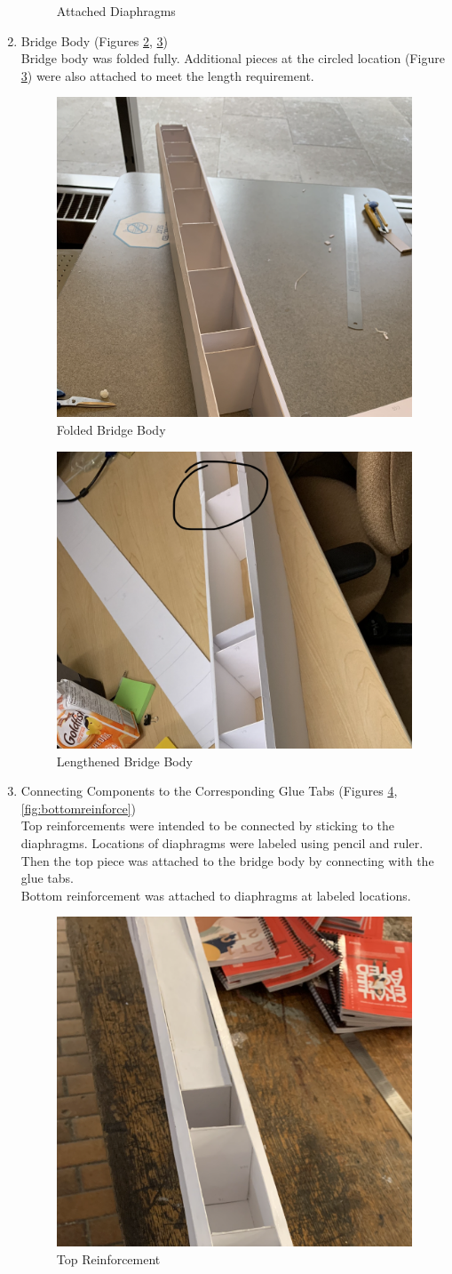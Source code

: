 \documentclass[11pt,twocolumn,letterpaper]{article}
\begin{document}
\begin{enumerate}
\begin{figure}[h!]
        \caption {Attached Diaphragms}
        \label{fig:diaphragm2}
    \hfill
    \end{figure}
    \item Bridge Body (Figures \ref{fig:body1}, \ref{fig:body2})\\
    Bridge body was folded fully. Additional pieces at the circled location (Figure \ref{fig:body2}) were also attached to meet the length requirement. 
    \begin{figure}[h!]
    \centering
        \includegraphics[width=.4\textwidth]{figures/bridgebody1.png}
        \caption {Folded Bridge Body}
        \label{fig:body1}
    \hfill
    \end{figure}
    \begin{figure}[h!]
    \centering
        \includegraphics[width=.4\textwidth]{figures/bridge2.png}
        \caption {Lengthened Bridge Body}
        \label{fig:body2}
    \hfill
    \end{figure}
    \item Connecting Components to the Corresponding Glue Tabs (Figures \ref{fig:topreinforce}, \ref{fig:bottomreinforce})\\
    Top reinforcements were intended to be connected by sticking to the diaphragms. Locations of diaphragms were labeled using pencil and ruler. Then the top piece was attached to the bridge body by connecting with the glue tabs. \\
    Bottom reinforcement was attached to diaphragms at labeled locations. 
    \begin{figure}[h!]
    \centering
        \includegraphics[width=.4\textwidth]{figures/toprein.png}
        \caption {Top Reinforcement}
        \label{fig:topreinforce}
    \hfill
    

\end{figure}
\end{enumerate}
\end{document}
